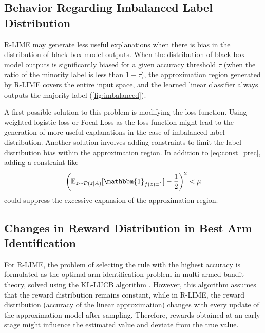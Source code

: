 \documentclass[11pt]{article}
\begin{document}
\subsection{Behavior Regarding Imbalanced Label Distribution}
R-LIME may generate less useful explanations
when there is bias in the distribution of black-box model outputs.
When the distribution of black-box model outputs is significantly biased
for a given accuracy threshold $\tau$
(when the ratio of the minority label is less than $1-\tau$),
the approximation region generated by R-LIME covers the entire input space,
and the learned linear classifier always outputs the majority label
(\cref{fig:imbalanced}).

A first possible solution to this problem is modifying the loss function.
Using weighted logistic loss or Focal Loss \cite{lin2020focal}
as the loss function might lead to the generation of more useful explanations
in the case of imbalanced label distribution.
Another solution involves adding constraints
to limit the label distribution bias within the approximation region.
In addition to \cref{eq:const_prec}, adding a constraint like
\begin{equation}
  {\left(\mathbb{E}_{z\sim\mathcal{D}(z\mid A)}[\mathbbm{1}_{f(z)=1}]-\frac{1}{2}\right)}^2<\mu
\end{equation}
could suppress the excessive expansion of the approximation region.

\subsection{Changes in Reward Distribution in Best Arm Identification}\label{sec:reward}
{%
  \renewcommand{\arraystretch}{1.1}
  \begin{table}[tbp]
    \centering
    \caption[Deviation between the estimated accuracy and the true accuracy]{%
      Deviation between the estimated accuracy and the true accuracy.
      Deviation was relatively small considering confidence level $1-\delta=0.95$.
    }\label{tab:reward}
    
  \end{table}
}
For R-LIME,
the problem of selecting the rule with the highest accuracy is formulated
as the optimal arm identification problem in multi-armed bandit theory,
solved using the KL-LUCB algorithm \cite{kaufmann2013information}.
However, this algorithm assumes that the reward distribution remains constant,
while in R-LIME,
the reward distribution (accuracy of the linear approximation)
changes with every update of the approximation model after sampling.
Therefore, rewards obtained at an early stage
might influence the estimated value and deviate from the true value.
\end{document}
